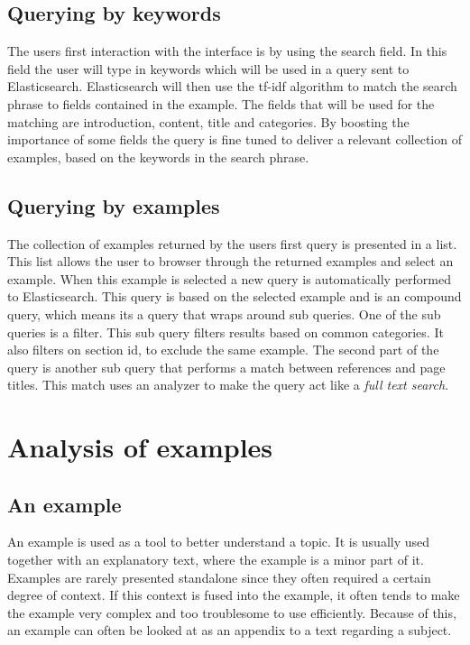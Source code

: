 \subsection{Querying by keywords}

The users first interaction with the interface is by using the search field. In this field the user will type in keywords which will be used in a query sent to Elasticsearch. Elasticsearch will then use the tf-idf algorithm to match the search phrase to fields contained in the example. The fields that will be used for the matching are introduction, content, title and categories. By boosting the importance of some fields the query is fine tuned to deliver a relevant collection of examples, based on the keywords in the search phrase.


\subsection{Querying by examples}
The collection of examples returned by the users first query is presented in a list. This list allows the user to browser through the returned examples and select an example. When this example is selected a new query is automatically performed to Elasticsearch. This query is based on the selected example and is an compound query, which means its a query that wraps around sub queries. One of the sub queries is a filter. This sub query filters results based on common categories. It also filters on section id, to exclude the same example. The second part of the query is another sub query that performs a match between references and page titles. This match uses an analyzer to make the query act like a \textit{full text search}. %


\section{Analysis of examples} %

\subsection{An example}

An example is used as a tool to better understand a topic. It is usually used together with an explanatory text, where the example is a minor part of it. Examples are rarely presented standalone since they often required a certain degree of context. If this context is fused into the example, it often tends to make the example very complex and too troublesome to use efficiently. Because of this, an example can often be looked at as an appendix to a text regarding a subject. 


